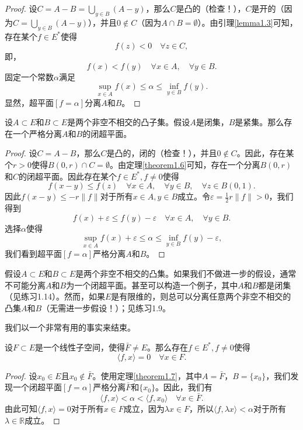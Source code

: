 \begin{proof}
设$C=A-B = \bigcup_{y \in B} (A-y)$，那么$C$是凸的（检查！），$C$是开的（因为$C=\bigcup_{y \in B}(A-y)$），并且$0 \notin C$（因为$A \cap B = \emptyset$）。由引理\ref{lemma1.3}可知，存在某个$f \in E^*$使得
\[ f(z) < 0 \quad \forall z \in C, \]
即，
\[ f(x) < f(y) \quad \forall x \in A, \quad \forall y \in B. \]
固定一个常数$\alpha$满足
\[ \sup_{x \in A} f(x) \leq \alpha \leq \inf_{y \in B} f(y). \]
显然，超平面$[f=\alpha]$分离$A$和$B$。
\end{proof}

\begin{theorem}\label{theorem1.7}
设$A \subset E$和$B \subset E$是两个非空不相交的凸子集。假设$A$是闭集，$B$是紧集。那么存在一个严格分离$A$和$B$的闭超平面。
\end{theorem}
\begin{proof}
设$C=A-B$，那么$C$是凸的，闭的（检查！），并且$0 \notin C$。因此，存在某个$r>0$使得$B(0,r) \cap C = \emptyset$。由定理\ref{theorem1.6}可知，存在一个分离$B(0,r)$和$C$的闭超平面。因此存在某个$f \in E^*, f \neq 0$使得
\[ f(x-y) \leq f(z) \quad \forall x \in A, \quad \forall y \in B, \quad \forall z \in B(0,1). \]
因此$f(x-y) \leq -r\|f\|$对于所有$x \in A, y \in B$成立。令$\varepsilon = \frac{1}{2}r\|f\| > 0$，我们得到
\[ f(x) + \varepsilon \leq f(y) - \varepsilon \quad \forall x \in A, \quad \forall y \in B. \]
选择$\alpha$使得
\[ \sup_{x \in A} f(x) + \varepsilon \leq \alpha \leq \inf_{y \in B} f(y) - \varepsilon, \]
我们看到超平面$[f=\alpha]$严格分离$A$和$B$。
\end{proof}

\begin{remark}
假设$A \subset E$和$B \subset E$是两个非空不相交的凸集。如果我们不做进一步的假设，通常不可能分离$A$和$B$为一个闭超平面。甚至可以构造一个例子，其中$A$和$B$都是闭集（见练习1.14）。然而，如果$E$是有限维的，则总可以分离任意两个非空不相交的凸集$A$和$B$（无需进一步假设！）；见练习1.9。
\end{remark}

我们以一个非常有用的事实来结束。
\begin{corollary}\label{corollary1.8}
设$F \subset E$是一个线性子空间，使得$\bar{F} \neq E$。那么存在$f \in E^*, f \neq 0$使得
\[ \langle f, x \rangle = 0 \quad \forall x \in F. \]
\end{corollary}
\begin{proof}
设$x_0 \in E$且$x_0 \notin \bar{F}$。使用定理\ref{theorem1.7}，其中$A=\bar{F}$，$B=\{x_0\}$，我们发现一个闭超平面$[f=\alpha]$严格分离$\bar{F}$和$\{x_0\}$。因此，我们有
\[ \langle f, x \rangle < \alpha < \langle f, x_0 \rangle \quad \forall x \in \bar{F}. \]
由此可知$\langle f, x \rangle = 0$对于所有$x \in F$成立，因为$\lambda x \in F$，所以$\langle f, \lambda x \rangle < \alpha$对于所有$\lambda \in \mathbb{R}$成立。
\end{proof}

